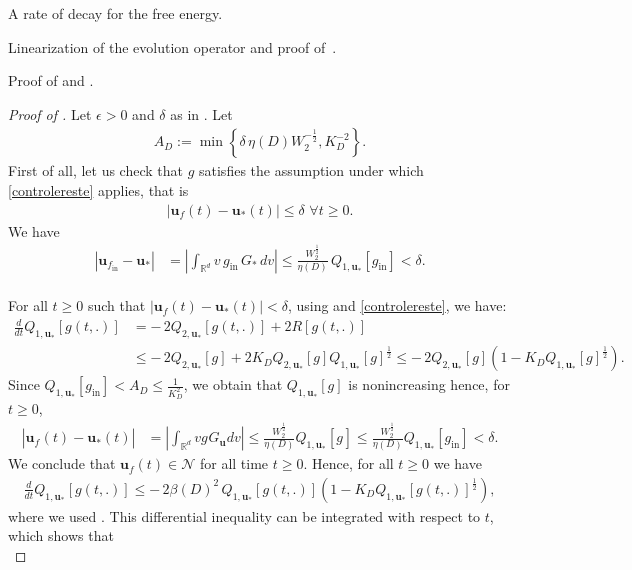 \documentclass[reqno]{amsart} %
\begin{document}
\begin{section}{A rate of decay for the free energy.}
\begin{section}{Linearization of the evolution operator and proof of~\texorpdfstring{}{thm3}.}
\begin{subsection}{Proof of  \texorpdfstring{}{thme1} and \texorpdfstring{}{thm3}.}
\begin{proof}[Proof of ]
Let $\epsilon>0$ and $\delta $ as in  .
  Let \begin{align*}
      A_D:= \min\left\{\delta \,\eta(D)W_2^{-\frac{1}{2}},K_D^{-2}\right\} .
  \end{align*} 
First of all, let us check that $g$ satisfies the assumption under which   \eqref{controlereste} applies, that is 
\begin{align*}
    |\mathbf{u}_{f}(t)-\mathbf{u}_*(t)| \leq \delta  \, \,\forall t \geq 0.
\end{align*}
We have
\begin{align*}
    |\mathbf{u}_{f_{\mathrm{in}}}-\mathbf{u}_*|&= \left | \int_{\mathbb{R}^d }v\,g_{\mathrm{in}}\,G_{*}\,dv\right|
    \leq \frac{W_2^{\frac{1}{2}}}{\eta(D)}\,Q_{1,\mathbf{u}_*}[g_{\mathrm{in}}]<\delta.
    \end{align*}
 \\
For all  $t \geq 0$ such that $|\mathbf{u}_{f}(t)-\mathbf{u}_*(t)|<\delta $,
using  and \eqref{controlereste}, we have:
 \begin{align*}
     \frac{d}{dt} Q_{1,\mathbf{u}_*}[g(t,.)]&= -\,2 Q_{2,\mathbf{u}_*}[g(t,.)]+2 R[g(t,.)] \\
     &\leq -\,2 Q_{2,\mathbf{u}_*}[g]+2 K_D Q_{2,\mathbf{u}_*}[g]  Q_{1,\mathbf{u}_*}[g]^{\frac{1}{2}} 
     \leq -\,2 Q_{2,\mathbf{u}_*}[g]\left(1-K_D  Q_{1,\mathbf{u}_*}[g]^{\frac{1}{2}} \right).
 \end{align*}
 Since $  Q_{1,\mathbf{u}_*}[g_{\mathrm{in}}]<A_D \leq \frac{1}{K_D^2}$,
 we obtain that $Q_{1,\mathbf{u}_*}[g]$ is nonincreasing hence, for $t\geq0$,
 \begin{align*}
    |\mathbf{u}_{f_{}}(t)-\mathbf{u}_*(t)|&= \left | \int_{\mathbb{R}^d }vg_{}G_{\mathbf{u}}dv\right|
    \leq \frac{W_2^{\frac{1}{2}}}{\eta(D)}Q_{1,\mathbf{u}_*}[g_{}] \leq\frac{W_2^{\frac{1}{2}}}{\eta(D)}Q_{1,\mathbf{u}_*}[g_{\mathrm{in}}]<\delta .
    \end{align*}
We conclude that $\mathbf{u}_{f}(t) \in \mathcal{N}$ for all time $t\geq 0$. Hence,
 for all $t\geq 0 $ we have
\begin{align*}
    \frac{d}{dt} Q_{1,\mathbf{u}_*}[g(t,.)]\leq -\,2 \beta(D)^2\,Q_{1,\mathbf{u}_*}[g(t,.)]\left(1-K_D  Q_{1,\mathbf{u}_*}[g(t,.)]^{\frac{1}{2}}\right),
\end{align*}
where we used . This differential inequality can be integrated with respect to $t$, which shows that 
\begin{equation*}

\end{equation*}
\end{proof}
\end{subsection}
\end{section}
\end{section}
\end{document}
